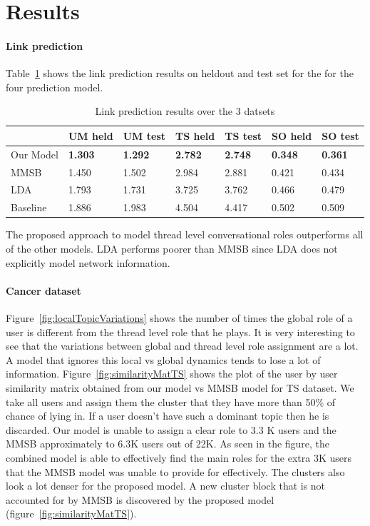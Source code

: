 \documentclass{sig-alternate}
\begin{document}
\section{Results}
\paragraph{Link prediction} Table~\ref{tab:predictionResults} shows the link
prediction results on heldout and test set for the for the four prediction
model.
\begin{table}
\begin{center} 
\begin{tabular}{p{1cm}|p{0.7cm}|p{0.7cm}|p{0.7cm}|p{0.7cm}|p{0.7cm}|p{0.7cm}|}
  & UM held & UM test & TS held & TS test & SO held & SO test \\\hline
Our Model & \textbf{1.303} &\textbf{1.292} &\textbf{2.782} & \textbf{2.748} & 
\textbf{0.348}& \textbf{0.361} \\\hline 
MMSB &1.450& 1.502 & 2.984& 2.881 &0.421 & 0.434 \\\hline 
LDA &1.793& 1.731	&3.725 & 3.762 &0.466 & 0.479\\\hline
Baseline &1.886& 1.983 &4.504 &4.417&0.502& 0.509\\\hline
\end{tabular}
\caption{Link prediction results over the 3 datsets }
\label{tab:predictionResults}
\end{center}
\end{table}

The proposed approach to model thread level conversational roles outperforms
all of the other models. LDA performs poorer than MMSB since LDA does not 
explicitly model network information. 
\paragraph{Cancer dataset}
Figure~\ref{fig:localTopicVariations} shows the number of times the global role
of a user is different from the thread level role that he plays. It is very
interesting to see that the variations between global and thread level role
assignment are a lot. A model that ignores this local vs global dynamics tends
to lose a lot of information. Figure~\ref{fig:similarityMatTS} shows the plot of
the user by user similarity matrix obtained from our model vs MMSB model for TS
dataset.
We take all users and assign them the cluster that they have more than 50\% of
chance of lying in. If a user doesn't have such a dominant topic then he is
discarded. Our model is unable to assign a clear role to 3.3 K users and
the MMSB approximately to 6.3K users out of 22K. As seen in the figure,
the combined model is able to effectively find the main roles for the extra 3K users that the
MMSB model was unable to provide for effectively. The clusters also look a lot
denser for the proposed model. A new cluster block that is not
accounted for by MMSB is discovered by the proposed model
(figure~\ref{fig:similarityMatTS}).
\end{document}
